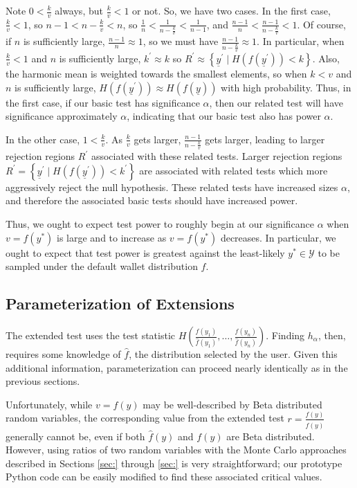 \documentclass{tran-l}
\theoremstyle{cor}
\theoremstyle{definition}
\theoremstyle{remark}
\theoremstyle{conjecture}
\numberwithin{equation}{section}
\begin{document}
Note $0 < \frac{k}{v}$ always, but $\frac{k}{v} < 1$ or not.
So, we have two cases.
In the first case, $\frac{k}{v} < 1$, so $n - 1 < n - \frac{k}{v} < n$, so $\frac{1}{n} < \frac{1}{n - \frac{k}{v}} < \frac{1}{n-1}$, and $\frac{n-1}{n} < \frac{n-1}{n - \frac{k}{v}} < 1$.
Of course, if $n$ is sufficiently large, $\frac{n-1}{n} \approx 1$, so we must have $\frac{n-1}{n - \frac{k}{v}} \approx 1$.
In particular, when $\frac{k}{v} < 1$ and $n$ is sufficiently large, $k^\prime \approx k$ so $R^\prime \approx \left\{\underline{y}^\prime \mid H(f(\underline{y}^\prime)) < k\right\}$.
Also, the harmonic mean is weighted towards the smallest elements, so when $k < v$ and $n$ is sufficiently large, $H(f(\underline{y}^\prime)) \approx H(f(\underline{y}))$ with high probability.
Thus, in the first case, if our basic test has significance $\alpha$, then our related test will have significance approximately $\alpha$, indicating that our basic test also has power $\alpha$.

In the other case, $1 < \frac{k}{v}$. As $\frac{k}{v}$ gets larger, $\frac{n-1}{n - \frac{k}{v}}$ gets larger, leading to larger rejection regions $R^\prime$ associated with these related tests.
Larger rejection regions $R^\prime = \left\{\underline{y}^\prime \mid H(f(\underline{y}^\prime)) < k^\prime\right\}$ are associated with related tests which more aggressively reject the null hypothesis.
These related tests have increased sizes $\alpha$, and therefore the associated basic tests should have increased power.

Thus, we ought to expect test power to roughly begin at our significance $\alpha$ when $v = f(y^*)$ is large and to increase as $v = f(y^*)$ decreases.
In particular, we ought to expect that test power is greatest against the least-likely $y^* \in \mathcal{Y}$ to be sampled under the default wallet distribution $f$.

\subsection{Parameterization of Extensions}

The extended test uses the test statistic $H\left(\frac{f(y_1)}{\hat{f}(y_1)}, \ldots, \frac{f(y_n)}{\hat{f}(y_n)}\right)$. Finding $h_\alpha$, then, requires some knowledge of $\hat{f}$, the distribution selected by the user.
Given this additional information, parameterization can proceed nearly identically as in the previous sections.

Unfortunately, while $v=f(y)$ may be well-described by Beta distributed random variables, the corresponding value from the extended test $r=\frac{f(y)}{\hat{f}(y)}$ generally cannot be, even if both $\hat{f}(y)$ and $f(y)$ are Beta distributed.
However, using ratios of two random variables with the Monte Carlo approaches described in Sections \ref{sec:} through \ref{sec:} is very straightforward; our prototype Python code can be easily modified to find these associated critical values.
\end{document}
